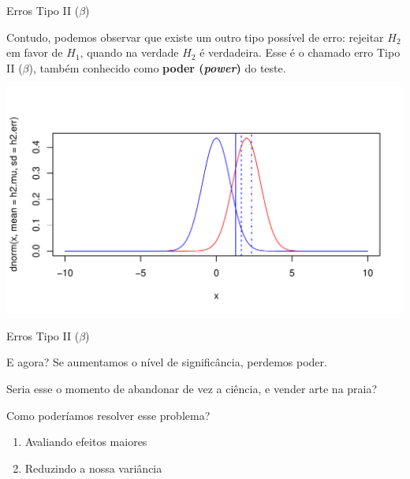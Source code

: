 \documentclass{beamer}\usepackage[]{graphicx}\usepackage[]{color}
\makeatletter
\def\maxwidth{ %
  \ifdim\Gin@nat@width>\linewidth
    \linewidth
  \else
    \Gin@nat@width
  \fi
}
\newenvironment{knitrout}{}{} %
\renewenvironment{knitrout}{\setlength{\topsep}{0mm}}{}
\makeatother
\begin{document}
\begin{frame}{Erros Tipo II ($\beta$)}

\small{Contudo, podemos observar que existe um outro tipo possível de erro: rejeitar $H_2$ em favor de $H_1$, quando na verdade $H_2$ é verdadeira. Esse é o chamado erro Tipo II ($\beta$), também conhecido como \textbf{poder (\emph{power})} do teste.}

\begin{knitrout}\tiny
{}\color{fgcolor}
\includegraphics[width=\maxwidth]{figure/erro5-1} 

\end{knitrout}

\end{frame}

\begin{frame}{Erros Tipo II ($\beta$)}

E agora? Se aumentamos o nível de significância, perdemos poder. 

Seria esse o momento de abandonar de vez a ciência, e vender arte na praia? \pause

Como poderíamos resolver esse problema? \pause

\begin{enumerate}

  \item Avaliando efeitos maiores
  
  \item Reduzindo a nossa variância

\end{enumerate}

\end{frame}
\end{document}
